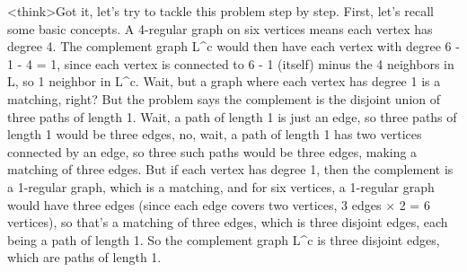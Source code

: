 <think>Got it, let's try to tackle this problem step by step. First, let's recall some basic concepts. A 4-regular graph on six vertices means each vertex has degree 4. The complement graph L^c would then have each vertex with degree 6 - 1 - 4 = 1, since each vertex is connected to 6 - 1 (itself) minus the 4 neighbors in L, so 1 neighbor in L^c. Wait, but a graph where each vertex has degree 1 is a matching, right? But the problem says the complement is the disjoint union of three paths of length 1. Wait, a path of length 1 is just an edge, so three paths of length 1 would be three edges, no, wait, a path of length 1 has two vertices connected by an edge, so three such paths would be three edges, making a matching of three edges. But if each vertex has degree 1, then the complement is a 1-regular graph, which is a matching, and for six vertices, a 1-regular graph would have three edges (since each edge covers two vertices, 3 edges × 2 = 6 vertices), so that's a matching of three edges, which is three disjoint edges, each being a path of length 1. So the complement graph L^c is three disjoint edges, which are paths of length 1. 

